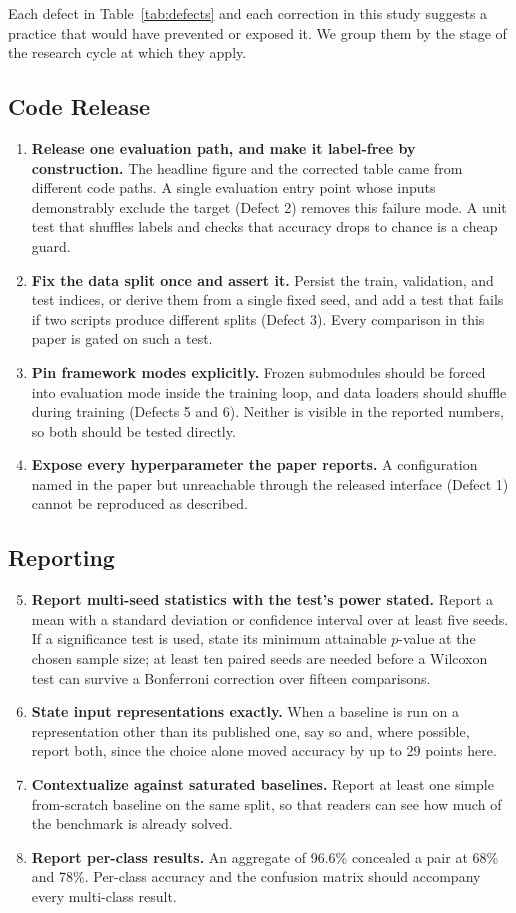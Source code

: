 \documentclass[journal]{IEEEtran}
\begin{document}
Each defect in Table~\ref{tab:defects} and each correction in this study suggests a practice that would have prevented or exposed it. We group them by the stage of the research cycle at which they apply.

\subsection{Code Release}
\begin{enumerate}
\item \textbf{Release one evaluation path, and make it label-free by construction.} The headline figure and the corrected table came from different code paths. A single evaluation entry point whose inputs demonstrably exclude the target (Defect 2) removes this failure mode. A unit test that shuffles labels and checks that accuracy drops to chance is a cheap guard.
\item \textbf{Fix the data split once and assert it.} Persist the train, validation, and test indices, or derive them from a single fixed seed, and add a test that fails if two scripts produce different splits (Defect 3). Every comparison in this paper is gated on such a test.
\item \textbf{Pin framework modes explicitly.} Frozen submodules should be forced into evaluation mode inside the training loop, and data loaders should shuffle during training (Defects 5 and 6). Neither is visible in the reported numbers, so both should be tested directly.
\item \textbf{Expose every hyperparameter the paper reports.} A configuration named in the paper but unreachable through the released interface (Defect 1) cannot be reproduced as described.
\end{enumerate}

\subsection{Reporting}
\begin{enumerate}
\setcounter{enumi}{4}
\item \textbf{Report multi-seed statistics with the test's power stated.} Report a mean with a standard deviation or confidence interval over at least five seeds. If a significance test is used, state its minimum attainable $p$-value at the chosen sample size; at least ten paired seeds are needed before a Wilcoxon test can survive a Bonferroni correction over fifteen comparisons.
\item \textbf{State input representations exactly.} When a baseline is run on a representation other than its published one, say so and, where possible, report both, since the choice alone moved accuracy by up to 29 points here.
\item \textbf{Contextualize against saturated baselines.} Report at least one simple from-scratch baseline on the same split, so that readers can see how much of the benchmark is already solved.
\item \textbf{Report per-class results.} An aggregate of 96.6\% concealed a pair at 68\% and 78\%. Per-class accuracy and the confusion matrix should accompany every multi-class result.
\end{enumerate}
\end{document}

